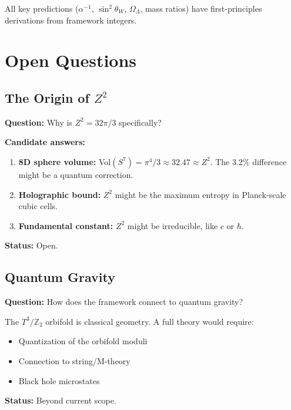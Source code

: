 \documentclass[12pt,a4paper]{article}
\newcommand{\Ztwo}{\mathbb{Z}_2}
\newcommand{\Tthree}{T^3}
\newcommand{\OmegaL}{\Omega_\Lambda}
\newcommand{\sinW}{\sin^2\theta_W}
\newcommand{\Zsq}{Z^2}
\begin{document}
All key predictions ($\alpha^{-1}$, $\sinW$, $\OmegaL$, mass ratios) have first-principles derivations from framework integers.

\section{Open Questions}
\label{sec:open}

\subsection{The Origin of $\Zsq$}

\textbf{Question:} Why is $\Zsq = 32\pi/3$ specifically?

\textbf{Candidate answers:}
\begin{enumerate}
    \item \textbf{8D sphere volume:} Vol$(S^7) = \pi^4/3 \approx 32.47 \approx \Zsq$. The 3.2\% difference might be a quantum correction.
    \item \textbf{Holographic bound:} $\Zsq$ might be the maximum entropy in Planck-scale cubic cells.
    \item \textbf{Fundamental constant:} $\Zsq$ might be irreducible, like $c$ or $\hbar$.
\end{enumerate}

\textbf{Status:} Open.

\subsection{Quantum Gravity}

\textbf{Question:} How does the framework connect to quantum gravity?

The $\Tthree/\Ztwo$ orbifold is classical geometry. A full theory would require:
\begin{itemize}
    \item Quantization of the orbifold moduli
    \item Connection to string/M-theory
    \item Black hole microstates
\end{itemize}

\textbf{Status:} Beyond current scope.

\appendix
\end{document}
